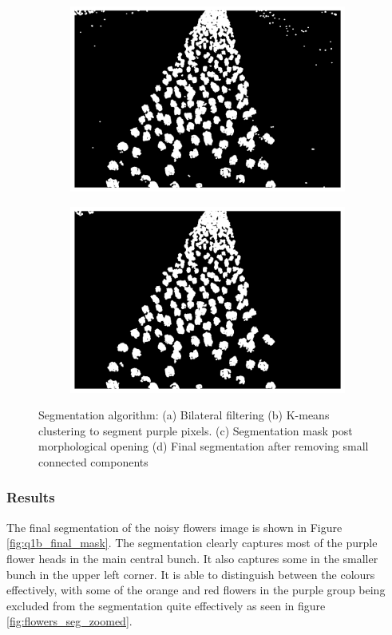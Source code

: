 \documentclass[11pt]{article}
\begin{document}
\begin{figure}[H]
\begin{subfigure}{.45\textwidth}
        \includegraphics[width=\linewidth]{figs/q1b_kmeans_mask_post_opening.png}
        \caption{}
        \label{fig:kmeans_mask_post_opening_flowers}
    \end{subfigure}%
    \begin{subfigure}{.45\textwidth}  %
        \centering
        \includegraphics[width=\linewidth]{figs/q1b_mask_post_cnc_removal.png}
        \caption{}
        \label{fig:cnc_threshold_flowers}
    \end{subfigure}%
    \caption{Segmentation algorithm: (a) Bilateral filtering (b) K-means clustering to segment purple pixels. (c) Segmentation mask post morphological opening (d) Final segmentation after removing small connected components}
    \label{fig:q1b_segmentation_steps}
\end{figure}

\subsubsection{Results}
The final segmentation of the noisy flowers image is shown in Figure \ref{fig:q1b_final_mask}. The segmentation clearly captures most of the purple flower heads in the main central bunch. It also captures some in the smaller bunch in the upper left corner. It is able to distinguish between the colours effectively, with some of the orange and red flowers in the purple group being excluded from the segmentation quite effectively as seen in figure \ref{fig:flowers_seg_zoomed}.
\end{document}
